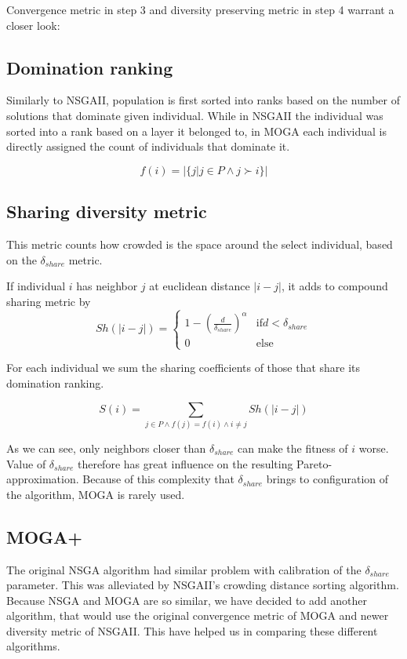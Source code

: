 \documentclass[12pt,oneside]{fithesis2}
\begin{document}
Convergence metric in step 3 and diversity preserving metric in step 4 warrant a closer look:

\subsection{Domination ranking}
Similarly to NSGAII, population is first sorted into ranks based on the number of solutions that dominate given individual. While in NSGAII the individual was sorted into a rank based on a layer it belonged to, in MOGA each individual is directly assigned the count of individuals that dominate it.

$$f(i) = |\{j|j \in P \land j \succ i\}|$$

\subsection{Sharing diversity metric}
This metric counts how crowded is the space around the select individual, based on the $\delta_{share}$ metric.

If individual $i$ has neighbor $j$ at euclidean distance $|i-j|$, it adds to compound sharing metric by
$$Sh(|i-j|) = \begin{cases} 
    1 - (\frac{d}{\delta_{share}})^\alpha & \text{if}  d < \delta_{share}\\
    0 & \text{else}
\end{cases}$$

For each individual we sum the sharing coefficients of those that share its domination ranking.

$$ S(i) = \sum\limits_{j \in P \land f(j) =f(i) \land i \neq j} Sh(|i-j|) $$

As we can see, only neighbors closer than $\delta_{share}$ can make the fitness of $i$ worse. Value of $\delta_{share}$ therefore has great influence on the resulting Pareto-approximation. Because of this complexity that $\delta_{share}$ brings to configuration of the algorithm, MOGA is rarely used.

\subsection{MOGA+}

The original NSGA algorithm had similar problem with calibration of the $\delta_{share}$ parameter. This was alleviated by NSGAII's crowding distance sorting algorithm. Because NSGA and MOGA are so similar, we have decided to add another algorithm, that would use the original convergence metric of MOGA and newer diversity metric of NSGAII. This have helped us in comparing these different algorithms.
\end{document}
